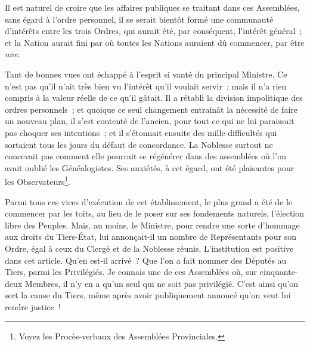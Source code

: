 \documentclass[french,twoside]{book} %
\begin{document}
Il est naturel de croire que les affaires publiques se traitant dans ces Assemblées, sans égard à l’ordre personnel, il se serait bientôt formé une communauté d’intérêts entre les trois Ordres, qui aurait été, par conséquent, l’intérêt général ; et la Nation aurait fini par où toutes les Nations auraient dû commencer, par être {\itshape une}.\par
Tant de bonnes vues ont échappé à l’esprit si vanté du principal Ministre. Ce n’est pas qu’il n’ait très bien vu l’intérêt qu’il voulait servir ; mais il n’a rien compris à la valeur réelle de ce qu’il gâtait. Il a rétabli la division impolitique des ordres personnels ; et quoique ce seul changement entrainât la nécessité de faire un nouveau plan, il s’est contenté de l’ancien, pour tout ce qui ne lui paraissait pas choquer ses intentions ; et il s’étonnait ensuite des mille difficultés qui sortaient tous les jours du défaut de concordance. La Noblesse surtout ne concevait pas comment elle pourrait se régénérer dans des assemblées où l’on avait oublié les Généalogistes. Ses anxiétés, à cet égard, ont été plaisantes pour les Observateurs\footnote{Voyez les Procès-verbaux des Assemblées Provinciales.}.\par
Parmi tous ces vices d’exécution de cet établissement, le plus grand a été de le commencer par les toits, au lieu de le poser sur ses fondements naturels, l’élection libre des Peuples. Mais, au moins, le Ministre, pour rendre une sorte d’hommage aux droits du Tiers-État, lui annonçait-il un nombre de Représentants pour son Ordre, égal à ceux du Clergé et de la Noblesse réunis. L’institution est positive dans cet article. Qu’en est-il arrivé ? Que l’on a fait nommer des Députés au Tiers, parmi les Privilégiés. Je connais une de ces Assemblées où, sur cinquante-deux Membres, il n’y en a qu’un seul qui ne soit pas privilégié. C’est ainsi qu’on sert la cause du Tiers, même après avoir publiquement annoncé qu’on veut lui rendre justice !
\end{document}
